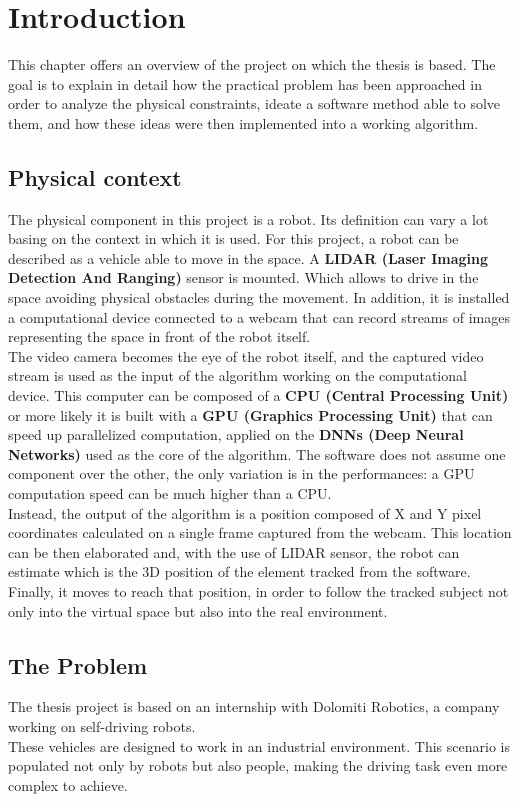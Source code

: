 \chapter{Introduction} \label{cha:introduction}
This chapter offers an overview of the project on which the thesis is based. The goal is to explain in detail how the practical problem has been approached in order to analyze the physical constraints, ideate a software method able to solve them, and how these ideas were then implemented into a working algorithm. 


\section{Physical context}
The physical component in this project is a robot. Its definition can vary a lot basing on the context in which it is used. For this project, a robot can be described as a vehicle able to move in the space. A \textbf{LIDAR (Laser Imaging Detection And Ranging)} sensor is mounted. Which allows to drive in the space avoiding physical obstacles during the movement. In addition, it is installed a computational device connected to a webcam that can record streams of images representing the space in front of the robot itself.\\
The video camera becomes the eye of the robot itself, and the captured video stream is used as the input of the algorithm working on the computational device. This computer can be composed of a \textbf{CPU (Central Processing Unit)} or more likely it is built with a \textbf{GPU (Graphics Processing Unit)} that can speed up parallelized computation, applied on the \textbf{DNNs (Deep Neural Networks)} used as the core of the algorithm. The software does not assume one component over the other, the only variation is in the performances: a GPU computation speed can be much higher than a CPU.\\
Instead, the output of the algorithm is a position composed of X and Y pixel coordinates calculated on a single frame captured from the webcam. This location can be then elaborated and, with the use of LIDAR sensor, the robot can estimate which is the 3D position of the element tracked from the software.\\
Finally, it moves to reach that position, in order to follow the tracked subject not only into the virtual space but also into the real environment.


\section{The Problem}
The thesis project is based on an internship with Dolomiti Robotics\cite{dolomitiRobotics}, a company working on self-driving robots.\\
These vehicles are designed to work in an industrial environment. This scenario is populated not only by robots but also people, making the driving task even more complex to achieve.

